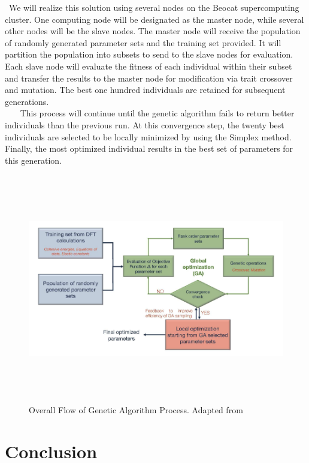 \documentclass[letterpaper, 12pt]{article}
\begin{document}
\begin{flushleft}
~\newline We will realize this solution using several nodes on the Beocat supercomputing cluster.   One computing node will be designated as the master node, while several other nodes will be the slave nodes.  The master node will receive the population of randomly generated parameter sets and the training set provided.  It will partition the population into subsets to send to the slave nodes for evaluation.  Each slave node will evaluate the fitness of each individual within their subset and transfer the results to the master node for modification via trait crossover and mutation. The best one hundred individuals are retained for subsequent generations.\\

~\newline ~\newline ~\newline 
This process will continue until the genetic algorithm fails to return better individuals than the previous run.  At this convergence step, the twenty best individuals are selected to be locally minimized by using the Simplex method.  Finally, the most optimized individual results in the best set of parameters for this generation.

\begin{figure}[H]
	\includegraphics[width=\linewidth,height=10cm,keepaspectratio]{flowchart.png}
	\caption[Overall Flow of Genetic Algorithm Process]{Overall Flow of Genetic Algorithm Process. Adapted from \cite{C7NR06038F}}
	\label{fig:arch}
\end{figure}


\section*{Conclusion}

\newpage
\printbibliography

\end{flushleft}
\end{document}
